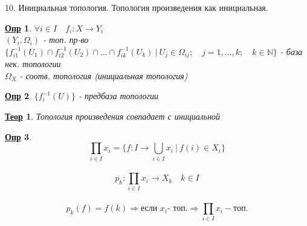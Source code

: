\documentclass[12pt, fleqn]{article}
\newenvironment{question}[1]{\hspace*{-4em} #1}{\newpage}
\newcommand{\N}{\mathbb{N}}
\newcommand{\ra}{\Rightarrow}
\newcommand{\q}{\quad}
\theoremstyle{nonumbermarginbreak}
\newtheorem{theorem}{\hspace*{-2em}\underline{\bfseries Теор}}[section]
\newtheorem{definition}{\hspace*{-2em}\underline{\bfseries Опр}}[section]
\begin{document}
    \begin{question}{10. Инициальная топология. Топология произведения как инициальная.}
        \begin{definition} 
            $\forall i \in I \q f_i: X \rightarrow Y_i$\\
            $(Y_i, \Omega_i)$ - топ. пр-во\\
            $\{f_{i1}^{-1}(U_1) \cap f_{i2}^{-1}(U_2) \cap ... \cap f_{ik}^{-1}(U_k) \  | \ U_j \in \Omega_{i j}; \q j = 1, ..., k; \q k \in \N \}$ 
            - база нек. топологии\\
            $\Omega_X$ - соотв. топология (инициальная топология)
        \end{definition}

        \begin{definition} 
            $\{f_i^{-1}(U)\}$ - предбаза топологии
        \end{definition}

        \begin{theorem} 
            Топология произведения совпадает с инициальной
        \end{theorem}

        \begin{definition} 
            \[\prod_{i \in I} x_i = \{f: I \rightarrow \bigcup_{i \in I} x_i \ | \ f(i) \in X_i \}\]\\
            \[p_k : \prod_{i \in I} x_i \rightarrow X_k \q k \in I\]\\
            \[p_k(f) = f(k) \ra  \text{если } x_i \text{- топ.} \ra \prod_{i \in I} x_i - \text{топ.}\]
        \end{definition}
    \end{question}
\end{document}
